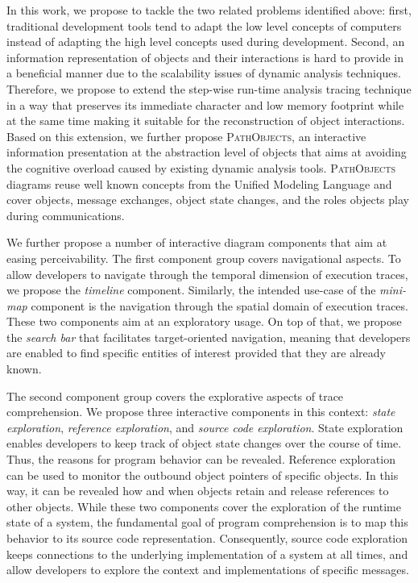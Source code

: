 In this work, we propose to tackle the two related problems identified above: first, traditional development tools tend to adapt the low level concepts of computers instead of adapting the high level concepts used during development.
Second, an information representation of objects and their interactions is hard to provide in a beneficial manner due to the scalability issues of dynamic analysis techniques.
Therefore, we propose to extend the step-wise run-time analysis tracing technique in a way that preserves its immediate character and low memory footprint while at the same time making it suitable for the reconstruction of object interactions.
Based on this extension, we further propose \textsc{PathObjects}, an interactive information presentation at the abstraction level of objects that aims at avoiding the cognitive overload caused by existing dynamic analysis tools.
\textsc{PathObjects} diagrams reuse well known concepts from the Unified Modeling Language and cover objects, message exchanges, object state changes, and the roles objects play during communications.

We further propose a number of interactive diagram components that aim at easing perceivability.
The first component group covers navigational aspects.
To allow developers to navigate through the temporal dimension of execution traces, we propose the \emph{timeline} component.
Similarly, the intended use-case of the \emph{mini-map} component is the navigation through the spatial domain of execution traces.
These two components aim at an exploratory usage.
On top of that, we propose the \emph{search bar} that facilitates target-oriented navigation, meaning that developers are enabled to find specific entities of interest provided that they are already known.

The second component group covers the explorative aspects of trace comprehension.
We propose three interactive components in this context: \emph{state exploration}, \emph{reference exploration}, and \emph{source code exploration}.
State exploration enables developers to keep track of object state changes over the course of time.
Thus, the reasons for program behavior can be revealed.
Reference exploration can be used to monitor the outbound object pointers of specific objects.
In this way, it can be revealed how and when objects retain and release references to other objects.
While these two components cover the exploration of the runtime state of a system, the fundamental goal of program comprehension is to map this behavior to its source code representation.
Consequently, source code exploration keeps connections to the underlying implementation of a system at all times, and allow developers to explore the context and implementations of specific messages.


